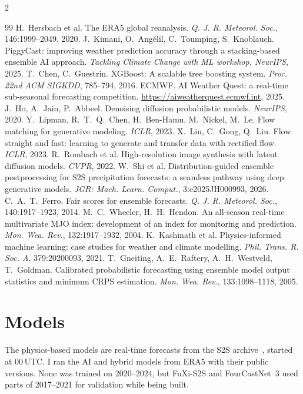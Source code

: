 \documentclass[11pt,a4paper]{article}
\begin{document}
\begin{multicols}{2}
\begin{thebibliography}{99}
 H.~Hersbach et al. The ERA5 global reanalysis. \emph{Q. J. R. Meteorol. Soc.}, 146:1999--2049, 2020.
 J.~Kimani, O.~Ang\'elil, C.~Toumping, S.~Knoblauch. PiggyCast: improving weather prediction accuracy through a stacking-based ensemble AI approach. \emph{Tackling Climate Change with ML workshop, NeurIPS}, 2025.
 T.~Chen, C.~Guestrin. XGBoost: A scalable tree boosting system. \emph{Proc. 22nd ACM SIGKDD}, 785--794, 2016.
 ECMWF. AI Weather Quest: a real-time sub-seasonal forecasting competition. \url{https://aiweatherquest.ecmwf.int}, 2025.
 J.~Ho, A.~Jain, P.~Abbeel. Denoising diffusion probabilistic models. \emph{NeurIPS}, 2020.
 Y.~Lipman, R.~T.~Q.~Chen, H.~Ben-Hamu, M.~Nickel, M.~Le. Flow matching for generative modeling. \emph{ICLR}, 2023.
 X.~Liu, C.~Gong, Q.~Liu. Flow straight and fast: learning to generate and transfer data with rectified flow. \emph{ICLR}, 2023.
 R.~Rombach et al. High-resolution image synthesis with latent diffusion models. \emph{CVPR}, 2022.
 W.~Shi et al. Distribution-guided ensemble postprocessing for S2S precipitation forecasts: a seamless pathway using deep generative models. \emph{JGR: Mach. Learn. Comput.}, 3:e2025JH000993, 2026.
 C.~A.~T.~Ferro. Fair scores for ensemble forecasts. \emph{Q. J. R. Meteorol. Soc.}, 140:1917--1923, 2014.
 M.~C.~Wheeler, H.~H.~Hendon. An all-season real-time multivariate MJO index: development of an index for monitoring and prediction. \emph{Mon. Wea. Rev.}, 132:1917--1932, 2004.
 K.~Kashinath et al. Physics-informed machine learning: case studies for weather and climate modelling. \emph{Phil. Trans. R. Soc. A}, 379:20200093, 2021.
 T.~Gneiting, A.~E.~Raftery, A.~H.~Westveld, T.~Goldman. Calibrated probabilistic forecasting using ensemble model output statistics and minimum CRPS estimation. \emph{Mon. Wea. Rev.}, 133:1098--1118, 2005.
\end{thebibliography}
\end{multicols}

\clearpage
\normalsize
\appendix
{}
\renewcommand{\thetable}{\thesection\arabic{table}}
\section{Models}
\label{app:systems}
The physics-based models are real-time forecasts from the S2S archive~\cite{vitart2017s2s}, started at 00\,UTC. I ran the AI and
hybrid models from ERA5 with their public versions. None was trained on 2020--2024, but FuXi-S2S and FourCastNet~3 used parts of
2017--2021 for validation while being built.
\end{document}
